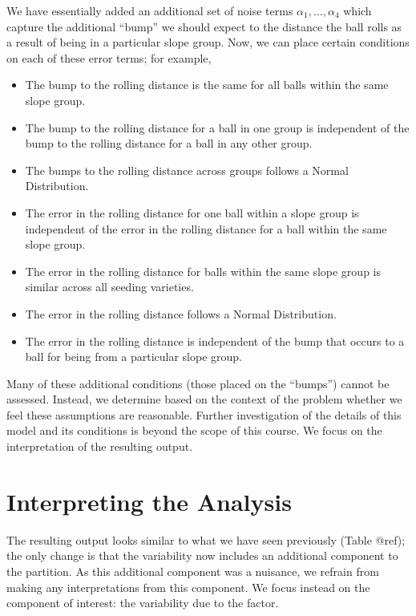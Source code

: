 \documentclass[]{book}
\providecommand{\tightlist}{%
  \setlength{\itemsep}{0pt}\setlength{\parskip}{0pt}}
\theoremstyle{definition}
\theoremstyle{definition}
\theoremstyle{remark}
\begin{document}
We have essentially added an additional set of noise terms
\(\alpha_1, \dotsc, \alpha_4\) which capture the additional ``bump'' we
should expect to the distance the ball rolls as a result of being in a
particular slope group. Now, we can place certain conditions on each of
these error terms; for example,

\begin{itemize}
\tightlist
\item
  The bump to the rolling distance is the same for all balls within the
  same slope group.
\item
  The bump to the rolling distance for a ball in one group is
  independent of the bump to the rolling distance for a ball in any
  other group.
\item
  The bumps to the rolling distance across groups follows a Normal
  Distribution.
\item
  The error in the rolling distance for one ball within a slope group is
  independent of the error in the rolling distance for a ball within the
  same slope group.
\item
  The error in the rolling distance for balls within the same slope
  group is similar across all seeding varieties.
\item
  The error in the rolling distance follows a Normal Distribution.
\item
  The error in the rolling distance is independent of the bump that
  occurs to a ball for being from a particular slope group.
\end{itemize}

Many of these additional conditions (those placed on the ``bumps'')
cannot be assessed. Instead, we determine based on the context of the
problem whether we feel these assumptions are reasonable. Further
investigation of the details of this model and its conditions is beyond
the scope of this course. We focus on the interpretation of the
resulting output.

\section{Interpreting the Analysis}\label{interpreting-the-analysis}

The resulting output looks similar to what we have seen previously
(Table @ref); the only change is that the variability now includes an
additional component to the partition. As this additional component was
a nuisance, we refrain from making any interpretations from this
component. We focus instead on the component of interest: the
variability due to the factor.
\end{document}
